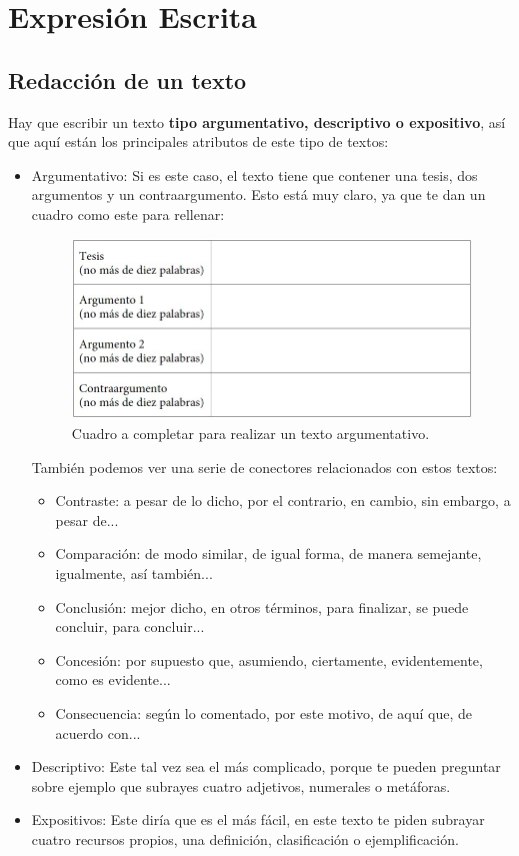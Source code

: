 \documentclass[arial,a4paper,print]{article}
\begin{document}
\section{Expresión Escrita}
\subsection{Redacción de un texto}

Hay que escribir un texto \textbf{tipo argumentativo, descriptivo o expositivo}, así que aquí están los principales atributos de este tipo de textos:
\begin{itemize}

\item Argumentativo: Si es este caso, el texto tiene que contener una tesis, dos argumentos y un contraargumento. Esto está muy claro, ya que te dan un cuadro como este para rellenar:
\begin{figure}[H]
	\centering
	\includegraphics[width=0.7\linewidth]{figures/cuadro_argumentos}
	\caption{Cuadro a completar para realizar un texto argumentativo. }
	\label{fig:cuadroargumentos}
\end{figure}

También podemos ver una serie de conectores relacionados con estos textos:
\begin{itemize}
\item Contraste: a pesar de lo dicho, por el contrario, en cambio, sin embargo, a pesar de...
\item Comparación: de modo similar, de igual forma, de manera semejante, igualmente, así también...
\item Conclusión: mejor dicho, en otros términos, para finalizar, se puede concluir, para concluir...
\item Concesión: por supuesto que, asumiendo, ciertamente, evidentemente, como es evidente...
\item Consecuencia: según lo comentado, por este motivo, de aquí que, de acuerdo con...
\end{itemize}

\item Descriptivo: Este tal vez sea el más complicado, porque te pueden preguntar sobre ejemplo que subrayes cuatro adjetivos, numerales o metáforas. 

\item Expositivos: Este diría que es el más fácil, en este texto te piden subrayar cuatro recursos propios, una definición, clasificación o ejemplificación.
\end{itemize}
\end{document}

